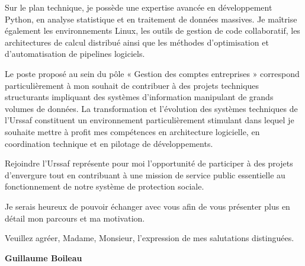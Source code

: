 \documentclass[11pt,a4paper]{../_shared/altacv}
\begin{document}
{Sur le plan technique, je possède une expertise avancée en développement Python, en analyse statistique et en traitement de données massives. Je maîtrise également les environnements Linux, les outils de gestion de code collaboratif, les architectures de calcul distribué ainsi que les méthodes d’optimisation et d’automatisation de pipelines logiciels.

Le poste proposé au sein du pôle « Gestion des comptes entreprises » correspond particulièrement à mon souhait de contribuer à des projets techniques structurants impliquant des systèmes d’information manipulant de grands volumes de données. La transformation et l’évolution des systèmes techniques de l’Urssaf constituent un environnement particulièrement stimulant dans lequel je souhaite mettre à profit mes compétences en architecture logicielle, en coordination technique et en pilotage de développements.

Rejoindre l’Urssaf représente pour moi l’opportunité de participer à des projets d’envergure tout en contribuant à une mission de service public essentielle au fonctionnement de notre système de protection sociale.

Je serais heureux de pouvoir échanger avec vous afin de vous présenter plus en détail mon parcours et ma motivation.

Veuillez agréer, Madame, Monsieur, l’expression de mes salutations distinguées.

\textbf{Guillaume Boileau}

}
\end{document}
